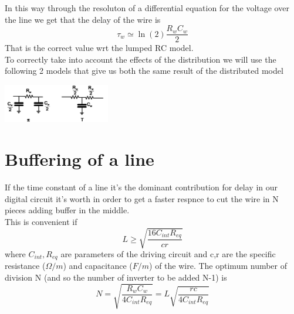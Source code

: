 In this way through the resoluton of a differential equation for the voltage over the line we get that the delay of the wire is 
\begin{equation}
\tau_w\simeq \ln(2)\frac{R_wC_w}{2}
\end{equation}
That is the correct value wrt the lumped RC model.\\

To correctly take into account the effects of the distribution we will use the following 2 models that give us both the same result of the distributed model

\centering
\includegraphics[width=0.35\textwidth]{C5_9.png}\\
\raggedright


\section{Buffering of a line}

If the time constant of a line it's the dominant contribution for delay in our digital circuit it's worth in order to get a faster respnce to cut the wire in N pieces adding buffer in the middle.\\
This is convenient if
\begin{equation}
L\ge\sqrt{\frac{16C_{int}R_{eq}}{cr}}
\end{equation}
where $C_{int},R_{eq}$ are parameters of the driving circuit and c,r are the specific resistance ($\Omega/m$) and capacitance ($F/m$) of the wire.
The optimum number of division N (and so the number of inverter to be added N-1) is
\begin{equation}
N=\sqrt{\frac{R_wC_w}{4C_{int}R_{eq}}}=L\sqrt{\frac{rc}{4C_{int}R_{eq}}}
\end{equation}
